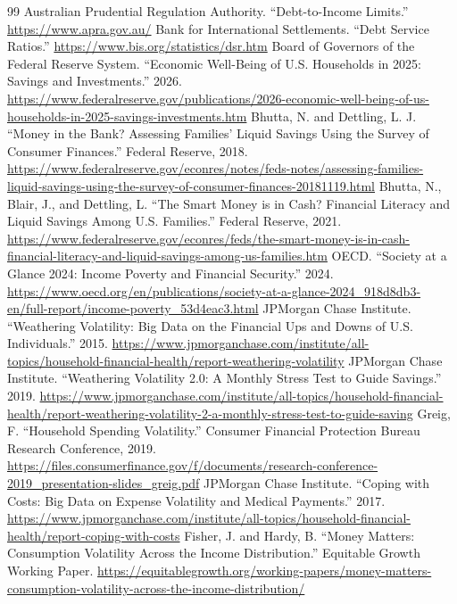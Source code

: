 \documentclass[11pt,a4paper]{article}
\begin{document}
\begin{thebibliography}{99}
 Australian Prudential Regulation Authority. ``Debt-to-Income Limits.'' \url{https://www.apra.gov.au/}
 Bank for International Settlements. ``Debt Service Ratios.'' \url{https://www.bis.org/statistics/dsr.htm}
 Board of Governors of the Federal Reserve System. ``Economic Well-Being of U.S. Households in 2025: Savings and Investments.'' 2026. \url{https://www.federalreserve.gov/publications/2026-economic-well-being-of-us-households-in-2025-savings-investments.htm}
 Bhutta, N. and Dettling, L. J. ``Money in the Bank? Assessing Families' Liquid Savings Using the Survey of Consumer Finances.'' Federal Reserve, 2018. \url{https://www.federalreserve.gov/econres/notes/feds-notes/assessing-families-liquid-savings-using-the-survey-of-consumer-finances-20181119.html}
 Bhutta, N., Blair, J., and Dettling, L. ``The Smart Money is in Cash? Financial Literacy and Liquid Savings Among U.S. Families.'' Federal Reserve, 2021. \url{https://www.federalreserve.gov/econres/feds/the-smart-money-is-in-cash-financial-literacy-and-liquid-savings-among-us-families.htm}
 OECD. ``Society at a Glance 2024: Income Poverty and Financial Security.'' 2024. \url{https://www.oecd.org/en/publications/society-at-a-glance-2024_918d8db3-en/full-report/income-poverty_53d4eac3.html}
 JPMorgan Chase Institute. ``Weathering Volatility: Big Data on the Financial Ups and Downs of U.S. Individuals.'' 2015. \url{https://www.jpmorganchase.com/institute/all-topics/household-financial-health/report-weathering-volatility}
 JPMorgan Chase Institute. ``Weathering Volatility 2.0: A Monthly Stress Test to Guide Savings.'' 2019. \url{https://www.jpmorganchase.com/institute/all-topics/household-financial-health/report-weathering-volatility-2-a-monthly-stress-test-to-guide-saving}
 Greig, F. ``Household Spending Volatility.'' Consumer Financial Protection Bureau Research Conference, 2019. \url{https://files.consumerfinance.gov/f/documents/research-conference-2019_presentation-slides_greig.pdf}
 JPMorgan Chase Institute. ``Coping with Costs: Big Data on Expense Volatility and Medical Payments.'' 2017. \url{https://www.jpmorganchase.com/institute/all-topics/household-financial-health/report-coping-with-costs}
 Fisher, J. and Hardy, B. ``Money Matters: Consumption Volatility Across the Income Distribution.'' Equitable Growth Working Paper. \url{https://equitablegrowth.org/working-papers/money-matters-consumption-volatility-across-the-income-distribution/}

\end{thebibliography}
\end{document}
